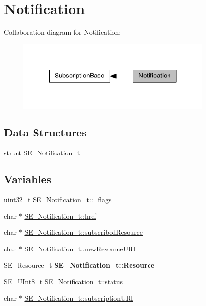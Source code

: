 \hypertarget{group__Notification}{}\section{Notification}
\label{group__Notification}
Collaboration diagram for Notification\+:\nopagebreak
\begin{figure}[H]
\begin{center}
\leavevmode
\includegraphics[width=275pt]{group__Notification}
\end{center}
\end{figure}
\subsection*{Data Structures}
\begin{DoxyCompactItemize}
\item 
struct \hyperlink{structSE__Notification__t}{S\+E\+\_\+\+Notification\+\_\+t}
\end{DoxyCompactItemize}
\subsection*{Variables}
\begin{DoxyCompactItemize}
\item 
uint32\+\_\+t \hyperlink{group__Notification_ga9cea77779c1429775de7c3bbf1e8c361}{S\+E\+\_\+\+Notification\+\_\+t\+::\+\_\+flags}
\item 
char $\ast$ \hyperlink{group__Notification_ga9d9fbe351ee2dd052e844c3dc0cd8222}{S\+E\+\_\+\+Notification\+\_\+t\+::href}
\item 
char $\ast$ \hyperlink{group__Notification_ga80e27fbceef2bc002f54d227f0815df6}{S\+E\+\_\+\+Notification\+\_\+t\+::subscribed\+Resource}
\item 
char $\ast$ \hyperlink{group__Notification_ga9dab2eb1085b330946a147430a8a9c3e}{S\+E\+\_\+\+Notification\+\_\+t\+::new\+Resource\+U\+RI}
\item 
\mbox{\label{group__Notification_gac7466837e2aee249a08e1a6f403cda84}} 
\hyperlink{structSE__Resource__t}{S\+E\+\_\+\+Resource\+\_\+t} {\bfseries S\+E\+\_\+\+Notification\+\_\+t\+::\+Resource}
\item 
\hyperlink{group__UInt8_gaf7c365a1acfe204e3a67c16ed44572f5}{S\+E\+\_\+\+U\+Int8\+\_\+t} \hyperlink{group__Notification_ga5ed1873d82ef9cabb0b98af44f0a3cc1}{S\+E\+\_\+\+Notification\+\_\+t\+::status}
\item 
char $\ast$ \hyperlink{group__Notification_gacd85c02c4ba0556285ab3f8544b31f96}{S\+E\+\_\+\+Notification\+\_\+t\+::subscription\+U\+RI}
\end{DoxyCompactItemize}


